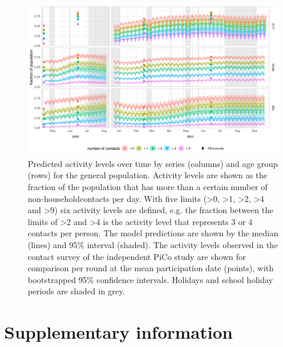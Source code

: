 \documentclass[fleqn,10pt]{wlscirep}
\begin{document}
\clearpage

\begin{figure}[ht]
\centering
\includegraphics[width=\linewidth]{../figures/prediction_generalpopulation_cat6.png}
\caption{Predicted activity levels over time by series (columns) and age group (rows) for the general population. Activity levels are shown as the fraction of the population that has more than a certain number of non-householdcontacts per day. With five limits (>0, >1, >2, >4 and >9) six activity levels are defined, e.g. the fraction between the limits of >2 and >4 is the activity level that represents 3 or 4 contacts per person. The model predictions are shown by the median (lines) and 95\% interval (shaded). The activity levels observed in the contact survey of the independent PiCo study are shown for comparison per round at the mean participation date (points), with bootstrapped 95\% confidence intervals. Holidays and school holiday periods are shaded in grey.}
\label{fig:genpop}
\end{figure}

\clearpage



\section*{Supplementary information}


\renewcommand{\thefigure}{S\arabic{figure}}
\setcounter{figure}{0}
\renewcommand{\thetable}{S\arabic{table}}
\setcounter{table}{0}
\end{document}
